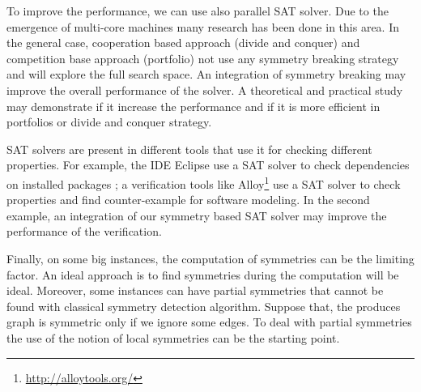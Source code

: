 To improve the performance, we can use also parallel SAT solver. Due to the emergence of multi-core machines
many research has been done in this area. In the general case, cooperation based approach (divide and conquer) and
competition base approach (portfolio)  not use any symmetry breaking strategy and will explore the full search space.
An integration of symmetry breaking may improve the overall performance of the solver.
A theoretical and practical study may demonstrate if it increase the performance and if it is more efficient in 
portfolios or divide and conquer strategy.


SAT solvers are present in different tools that use it for checking different properties. For example, 
the IDE Eclipse use a SAT solver to check dependencies on installed packages \cite{le2008sat};
a verification tools like Alloy\footnote{\url{http://alloytools.org/}} use a SAT solver to check properties and find
counter-example for software modeling. In the second example, an integration of our symmetry based SAT solver may improve the performance of the verification.

Finally, on some big instances, the computation of symmetries can be the limiting factor. An ideal approach is to find 
symmetries during the computation will be ideal. %
Moreover, some instances can have partial symmetries that cannot be 
found with classical symmetry detection algorithm. Suppose that, the produces graph is symmetric only if we ignore some 
edges. To deal with partial symmetries the use of the notion of local symmetries can be the starting point.


 
